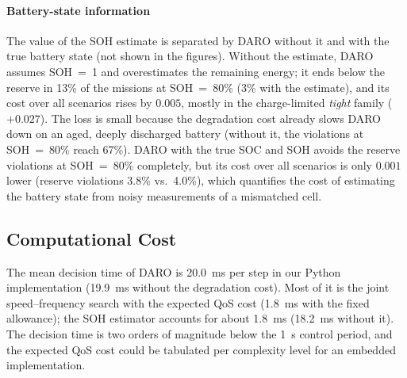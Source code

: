 \paragraph{Battery-state information}
The value of the \ac{SOH} estimate is separated by DARO without it and with the true battery state
(not shown in the figures). Without the estimate, DARO assumes \ac{SOH}~=~1 and overestimates the
remaining energy; it ends below the reserve in 13\% of the missions at \ac{SOH}~=~80\% (3\% with the
estimate), and its cost over all scenarios rises by $0.005$, mostly in the charge-limited
\emph{tight} family ($+0.027$). The loss is small because the degradation cost already slows DARO down
on an aged, deeply discharged battery (without it, the violations at \ac{SOH}~=~80\% reach 67\%). DARO with the true \ac{SOC} and
\ac{SOH} avoids the reserve violations at \ac{SOH}~=~80\% completely, but its cost over all scenarios
is only $0.001$ lower (reserve violations 3.8\% vs.\ 4.0\%), which quantifies the cost of estimating
the battery state from noisy measurements of a mismatched cell.

\subsection{Computational Cost}
\label{sec:exp:cost}

The mean decision time of DARO is 20.0~ms per step in our Python implementation
(19.9~ms without the degradation cost). Most of it is the joint speed--frequency search with the expected
\ac{QoS} cost (1.8~ms with the fixed allowance); the \ac{SOH} estimator accounts for about 1.8~ms
(18.2~ms without it). The decision time is two orders of magnitude below the
1~s control period, and the expected \ac{QoS} cost could be tabulated per complexity level
for an embedded implementation.
